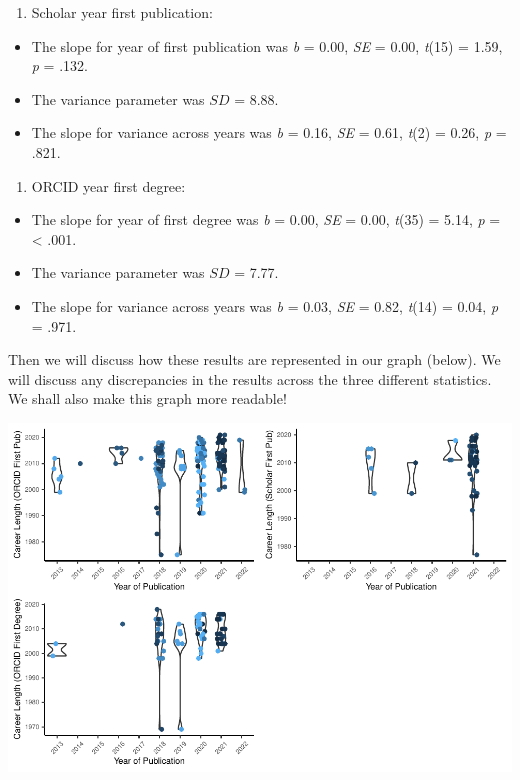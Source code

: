 \documentclass[
  english,
  man]{apa6}
\providecommand{\tightlist}{%
  \setlength{\itemsep}{0pt}\setlength{\parskip}{0pt}}
\begin{document}
\begin{enumerate}
\def\labelenumi{\arabic{enumi})}
\setcounter{enumi}{1}
\tightlist
\item
  Scholar year first publication:
\end{enumerate}

\begin{itemize}
\tightlist
\item
  The slope for year of first publication was \emph{b} = 0.00, \emph{SE} = 0.00, \emph{t}(15) = 1.59, \emph{p} = .132.
\item
  The variance parameter was \(SD\) = 8.88.
\item
  The slope for variance across years was \emph{b} = 0.16, \emph{SE} = 0.61, \emph{t}(2) = 0.26, \emph{p} = .821.
\end{itemize}

\begin{enumerate}
\def\labelenumi{\arabic{enumi})}
\setcounter{enumi}{2}
\tightlist
\item
  ORCID year first degree:
\end{enumerate}

\begin{itemize}
\tightlist
\item
  The slope for year of first degree was \emph{b} = 0.00, \emph{SE} = 0.00, \emph{t}(35) = 5.14, \emph{p} = \textless{} .001.
\item
  The variance parameter was \(SD\) = 7.77.
\item
  The slope for variance across years was \emph{b} = 0.03, \emph{SE} = 0.82, \emph{t}(14) = 0.04, \emph{p} = .971.
\end{itemize}

Then we will discuss how these results are represented in our graph (below). We will discuss any discrepancies in the results across the three different statistics. We shall also make this graph more readable!

\includegraphics{04.manuscript_files/figure-latex/figure2-1.pdf}
\end{document}
